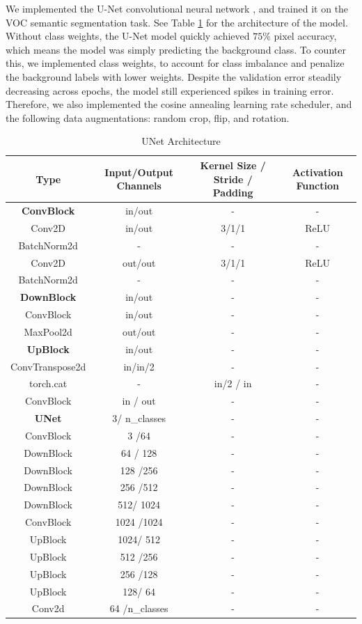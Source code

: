 \documentclass{article}
\begin{document}
We implemented the U-Net convolutional neural network \cite{unet}, and trained it on the VOC semantic segmentation task. See Table \ref{tab:experimental_3} for the architecture of the model. \\
Without class weights, the U-Net model quickly achieved $75\% $ pixel accuracy, which means the model was simply predicting the background class. To counter this, we implemented class weights, to account for class imbalance and penalize the background labels with lower weights. Despite the validation error steadily decreasing across epochs, the model still experienced spikes in training error. Therefore, we also implemented the cosine annealing learning rate scheduler, and the following data augmentations: random crop, flip, and rotation. 
\begin{table}[H]
\caption{UNet Architecture}
\label{tab:experimental_3}
\centering
\begin{tabular}{cccc}
  \toprule
  \textbf{Type} & \textbf{Input/Output Channels} & \textbf{Kernel Size / Stride / Padding} & \textbf{Activation Function} \\ 
  \midrule
  \textbf{ConvBlock} & in/out & - & - \\
  \hline
  Conv2D & in/out & 3/1/1 & ReLU \\ 
  BatchNorm2d & - & - & - \\ 
  Conv2D & out/out & 3/1/1 & ReLU \\ 
  BatchNorm2d & - & - & - \\ 
  \hline
  \textbf{DownBlock} & in/out & - & - \\
  \hline
  ConvBlock & in/out & - & - \\ 
  MaxPool2d & out/out & - & - \\ 
  \hline
  \textbf{UpBlock} & in/out & - & - \\
  \hline
  ConvTranspose2d& in/in/2 & - & - \\ 
  torch.cat & - & in/2 / in & - \\ 
  ConvBlock & in / out & - & - \\ 
  \hline
  \textbf{UNet} & 3/ n\_classes & - & - \\ 
  \hline
  ConvBlock & 3 /64 & - & - \\
  DownBlock & 64 / 128 & - & - \\
  DownBlock & 128 /256 & - & - \\
  DownBlock & 256 /512 & - & - \\
  DownBlock & 512/ 1024 & - & - \\
  ConvBlock & 1024 /1024 & - & - \\
  UpBlock & 1024/ 512 & - & - \\
  UpBlock & 512 /256 & - & - \\
  UpBlock & 256 /128 & - & - \\
  UpBlock & 128/ 64 & - & - \\
  Conv2d & 64 /n\_classes & - & - \\
  \bottomrule
\end{tabular}
\end{table}
\end{document}
